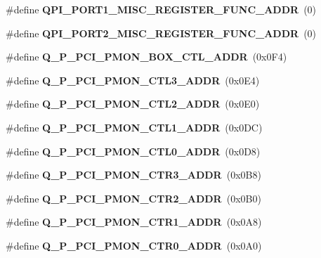 \begin{DoxyCompactItemize}
\item 
\#define {\bfseries Q\+P\+I\+\_\+\+P\+O\+R\+T1\+\_\+\+M\+I\+S\+C\+\_\+\+R\+E\+G\+I\+S\+T\+E\+R\+\_\+\+F\+U\+N\+C\+\_\+\+A\+D\+D\+R}~(0)\label{types_8h_a7d4c95f2092d55b5e9f61255997f73f4}

\item 
\#define {\bfseries Q\+P\+I\+\_\+\+P\+O\+R\+T2\+\_\+\+M\+I\+S\+C\+\_\+\+R\+E\+G\+I\+S\+T\+E\+R\+\_\+\+F\+U\+N\+C\+\_\+\+A\+D\+D\+R}~(0)\label{types_8h_a35242ec7f0ef05f8388dd6215dce5fdd}

\item 
\#define {\bfseries Q\+\_\+\+P\+\_\+\+P\+C\+I\+\_\+\+P\+M\+O\+N\+\_\+\+B\+O\+X\+\_\+\+C\+T\+L\+\_\+\+A\+D\+D\+R}~(0x0\+F4)\label{types_8h_a6ccbec11cd5e24b282e3c196b53e94a0}

\item 
\#define {\bfseries Q\+\_\+\+P\+\_\+\+P\+C\+I\+\_\+\+P\+M\+O\+N\+\_\+\+C\+T\+L3\+\_\+\+A\+D\+D\+R}~(0x0\+E4)\label{types_8h_a61bcadc16b6f19e0d5b8f6c975fa641e}

\item 
\#define {\bfseries Q\+\_\+\+P\+\_\+\+P\+C\+I\+\_\+\+P\+M\+O\+N\+\_\+\+C\+T\+L2\+\_\+\+A\+D\+D\+R}~(0x0\+E0)\label{types_8h_afc483051e408adfbe86571ad821d9e4f}

\item 
\#define {\bfseries Q\+\_\+\+P\+\_\+\+P\+C\+I\+\_\+\+P\+M\+O\+N\+\_\+\+C\+T\+L1\+\_\+\+A\+D\+D\+R}~(0x0\+D\+C)\label{types_8h_a4d6a4c1abdae11ab4c6616b473ad315c}

\item 
\#define {\bfseries Q\+\_\+\+P\+\_\+\+P\+C\+I\+\_\+\+P\+M\+O\+N\+\_\+\+C\+T\+L0\+\_\+\+A\+D\+D\+R}~(0x0\+D8)\label{types_8h_a5d9c2ce10cf815eb05a1c2fa09875850}

\item 
\#define {\bfseries Q\+\_\+\+P\+\_\+\+P\+C\+I\+\_\+\+P\+M\+O\+N\+\_\+\+C\+T\+R3\+\_\+\+A\+D\+D\+R}~(0x0\+B8)\label{types_8h_a6c6ae71785936eb30a2be9586e239ff3}

\item 
\#define {\bfseries Q\+\_\+\+P\+\_\+\+P\+C\+I\+\_\+\+P\+M\+O\+N\+\_\+\+C\+T\+R2\+\_\+\+A\+D\+D\+R}~(0x0\+B0)\label{types_8h_a4053d31c743c734b64e7326617823ee8}

\item 
\#define {\bfseries Q\+\_\+\+P\+\_\+\+P\+C\+I\+\_\+\+P\+M\+O\+N\+\_\+\+C\+T\+R1\+\_\+\+A\+D\+D\+R}~(0x0\+A8)\label{types_8h_aae73f1b8f3a0d7a574395a7b472e1fd6}

\item 
\#define {\bfseries Q\+\_\+\+P\+\_\+\+P\+C\+I\+\_\+\+P\+M\+O\+N\+\_\+\+C\+T\+R0\+\_\+\+A\+D\+D\+R}~(0x0\+A0)\label{types_8h_aadb5219a896f99247fd4cd0ab62c656c}


\end{DoxyCompactItemize}
